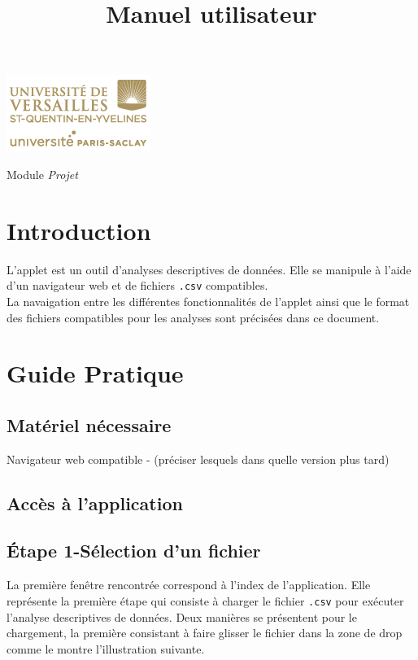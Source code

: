 

\title{\vspace{\fill}\textbf{\Huge Manuel utilisateur}}


\clearpage
\maketitle\vspace{9em}
\begin{center}\includegraphics[scale=0.7]{../Cahier/logo.png}\end{center}
\begin{flushright}Module \textit{Projet}\end{flushright}
\newpage
\tableofcontents
\newpage\clearpage{}

\section{Introduction}
	L'applet est un outil d'analyses descriptives de données. Elle se manipule à l'aide d'un navigateur web et de fichiers \lstinline!.csv! compatibles.\\
	La navaigation entre les différentes fonctionnalités de l'applet ainsi que le format des fichiers compatibles pour les analyses sont précisées dans ce document.
	
\section{Guide Pratique}
	\subsection{Matériel nécessaire}
		Navigateur web compatible - (préciser lesquels dans quelle version plus tard)
	\subsection{Accès à l'application}
	\subsection{Étape 1-Sélection d'un fichier}
		La première fenêtre rencontrée correspond à l'index de l'application. Elle représente la première étape qui consiste à charger le fichier \lstinline!.csv! pour exécuter l'analyse descriptives de données. 
		Deux manières se présentent pour le chargement, la première consistant à faire glisser le fichier dans la zone de drop comme le montre l'illustration suivante. \\
		
